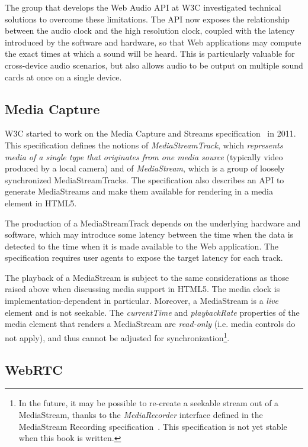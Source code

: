 \documentclass[graybox]{svmult}
\begin{document}
The group that develops the Web Audio API at W3C investigated technical
solutions to overcome these limitations. The API now exposes the relationship
between the audio clock and the high resolution clock, coupled with the
latency introduced by the software and hardware, so that Web applications may
compute the exact times at which a sound will be heard. This is particularly
valuable for cross-device audio scenarios, but also allows audio to
be output on multiple sound cards at once on a single device.




\subsection{Media Capture}
\label{sec:capture}

W3C started to work on the Media Capture and Streams
specification~\cite{capture} in 2011. This specification defines the notions
of \emph{MediaStreamTrack}, which \emph{represents media of a single type that
originates from one media source} (typically video produced by a local camera)
and of \emph{MediaStream}, which is a group of loosely synchronized
MediaStreamTracks. The specification also describes an API to generate
MediaStreams and make them available for rendering in a media element in
HTML5.

The production of a MediaStreamTrack depends on the underlying hardware and
software, which may introduce some latency between the time when the data is
detected to the time when it is made available to the Web application. The
specification requires user agents to expose the target latency for each
track.

The playback of a MediaStream is subject to the same considerations as those
raised above when discussing media support in HTML5. The media clock is
implementation-dependent in particular. Moreover, a MediaStream is a
\emph{live} element and is not seekable. The \emph{currentTime} and
\emph{playbackRate} properties of the media element that renders a MediaStream
are \emph{read-only} (i.e. media controls do not apply), and thus cannot be
adjusted for synchronization\footnote{In the future, it may be possible to re-create 
a seekable stream out of a MediaStream, thanks to the
\emph{MediaRecorder} interface defined in the MediaStream Recording
specification~\cite{mediastreamrecording}. This specification is not yet stable when this book is
written.}.


\subsection{WebRTC}
\label{sec:webrtc}
\end{document}

